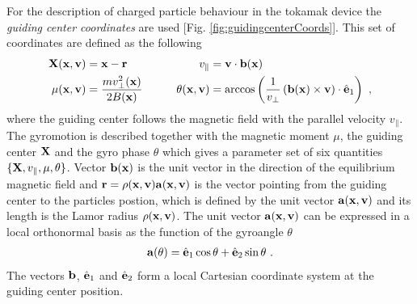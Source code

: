 For the description of charged particle behaviour in the tokamak device the \textit{guiding center coordinates} are used [Fig. \ref{fig:guidingcenterCoords}]. This set of coordinates are defined as the following
\begin{gather}
    \begin{aligned}
        \boldsymbol{\mathbf{X}}(\boldsymbol{\mathbf{x}},\boldsymbol{\mathbf{v}}) &= \boldsymbol{\mathbf{x}} - \boldsymbol{\mathbf{r}} &\qquad v_\parallel &= \boldsymbol{\mathbf{v}} \cdot \boldsymbol{\mathbf{b}}(\boldsymbol{\mathbf{x}}) \\
        \mu(\boldsymbol{\mathbf{x}},\boldsymbol{\mathbf{v}}) &= \frac{m v_\perp^2(\boldsymbol{\mathbf{x}})}{2B(\boldsymbol{\mathbf{x}})} &\qquad \theta(\boldsymbol{\mathbf{x}},\boldsymbol{\mathbf{v}}) &= \arccos\left(\frac{1}{v_\perp}\left(\boldsymbol{\mathbf{b}}(\boldsymbol{\mathbf{x}}) \times \boldsymbol{\mathbf{v}}\right)\cdot \hat{\boldsymbol{\mathbf{e}}}_1\right)~,\\
    \end{aligned}
    \label{eq:guidingcenterCoords}
\end{gather}
where the guiding center follows the magnetic field with the parallel velocity $v_{\parallel}$. The gyromotion is described together with the magnetic moment $\mu$, the guiding center $\boldsymbol{\mathbf{X}}$ and the gyro phase $\theta$ which gives a parameter set of six quantities $\{\boldsymbol{\mathbf{X}}, v_{\parallel}, \mu, \theta\}$. Vector $\boldsymbol{\mathbf{b}}(\boldsymbol{\mathbf{x}})$ is the unit vector in the direction of the equilibrium magnetic field and $\boldsymbol{\mathbf{r}} = \rho(\boldsymbol{\mathbf{x}},\boldsymbol{\mathbf{v}})\boldsymbol{\mathbf{a}}(\boldsymbol{\mathbf{x}},\boldsymbol{\mathbf{v}})$ is the vector pointing from the guiding center to the particles postion, which is defined by the unit vector $\boldsymbol{\mathbf{a}}(\boldsymbol{\mathbf{x}},\boldsymbol{\mathbf{v}})$ and its length is the Lamor radius $\rho(\boldsymbol{\mathbf{x}},\boldsymbol{\mathbf{v}})$. The unit vector $\boldsymbol{\mathbf{a}}(\boldsymbol{\mathbf{x}},\boldsymbol{\mathbf{v}})$ can be expressed in a local orthonormal basis as the function of the gyroangle $\theta$ 
\begin{gather}
    \boldsymbol{\mathbf{a}}(\theta) = \hat{\boldsymbol{\mathbf{e}}}_1 \cos\theta + \hat{\boldsymbol{\mathbf{e}}}_2 \sin\theta~.
    \label{eq:guidingcenterUnitvect}
\end{gather} 
The vectors $\boldsymbol{\mathbf{b}}$, $\hat{\boldsymbol{\mathbf{e}}}_1$ and $\hat{\boldsymbol{\mathbf{e}}}_2$ form a local Cartesian coordinate system at the guiding center position. 


\newpage

